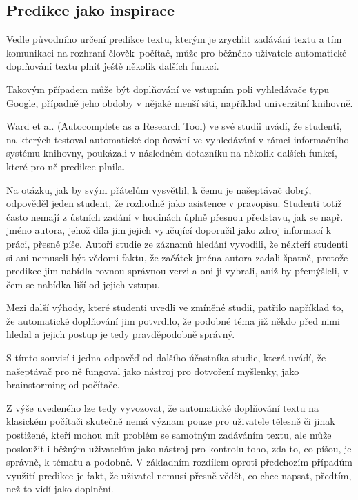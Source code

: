 \documentclass[a4paper,11pt]{article}
\begin{document}
\subsection{Predikce jako inspirace}

Vedle původního určení predikce textu, kterým je zrychlit zadávání textu a tím komunikaci na rozhraní člověk--počítač, může pro běžného uživatele automatické doplňování textu plnit ještě několik dalších funkcí.

Takovým případem může být doplňování ve vstupním poli vyhledávače typu Google, případně jeho obdoby v nějaké menší síti, například univerzitní knihovně.

Ward et al. (Autocomplete as a Research Tool) ve své studii uvádí, že studenti, na kterých testoval automatické doplňování ve vyhledávání v rámci informačního systému knihovny, poukázali v následném dotazníku na několik dalších funkcí, které pro ně predikce plnila. 

Na otázku, jak by svým přátelům vysvětlil, k čemu je našeptávač dobrý, odpověděl jeden student, že rozhodně jako asistence v pravopisu. Studenti totiž často nemají z ústních zadání v hodinách úplně přesnou představu, jak se např. jméno autora, jehož díla jim jejich vyučující doporučil jako zdroj informací k práci, přesně píše. Autoři studie ze záznamů hledání vyvodili, že někteří studenti si ani nemuseli být vědomi faktu, že začátek jména autora zadali špatně, protože predikce jim nabídla rovnou správnou verzi a oni ji vybrali, aniž by přemýšleli, v čem se nabídka liší od jejich vstupu. 

Mezi další výhody, které studenti uvedli ve zmíněné studii, patřilo například to, že automatické doplňování jim potvrdilo, že podobné téma již někdo před nimi hledal a jejich postup je tedy pravděpodobně správný. 

S tímto souvisí i jedna odpověď od dalšího účastníka studie, která uvádí, že našeptávač pro ně fungoval jako nástroj pro dotvoření myšlenky, jako brainstorming od počítače. 

Z výše uvedeného lze tedy vyvozovat, že automatické doplňování textu na klasickém počítači skutečně nemá význam pouze pro uživatele tělesně či jinak postižené, kteří mohou mít problém se samotným zadáváním textu, ale může posloužit i běžným uživatelům jako nástroj pro kontrolu toho, zda to, co píšou, je správně, k tématu a podobně. V základním rozdílem oproti předchozím případům využití predikce je fakt, že uživatel nemusí přesně vědět, co chce napsat, předtím, než to vidí jako doplnění.
\end{document}
